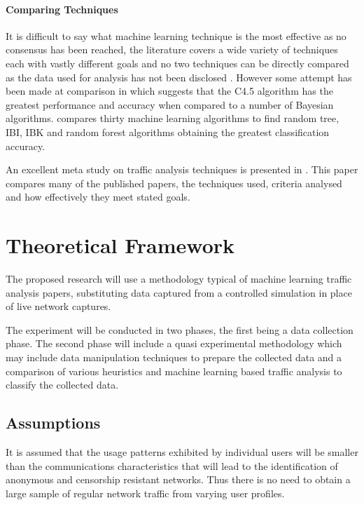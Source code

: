 \documentclass{conference}
\begin{document}
\subsubsection{Comparing Techniques}

It is difficult to say what machine learning technique is the most effective as no consensus has been reached, the literature covers a wide variety of techniques each with vastly different goals and no two techniques can be directly compared as the data used for analysis has not been disclosed \citep{Kim:2007p3867}. However some attempt has been made at comparison in \cite{Williams:2006p3849} which suggests that the C4.5 algorithm has the greatest performance and accuracy when compared to a number of Bayesian algorithms. \cite{Mohd:2009p6484} compares thirty machine learning algorithms  to find random tree, IBI, IBK and random forest algorithms obtaining the greatest classification accuracy.

An excellent meta study on traffic analysis techniques is presented in \cite{Nguyen:2008p3837}. This paper compares many of the published papers, the techniques used, criteria analysed and how effectively they meet stated goals.

\chapter{Theoretical Framework}

The proposed research will use a methodology typical of machine learning traffic analysis papers, substituting data captured from a controlled simulation in place of live network captures. 

The experiment will be conducted in two phases, the first being a data collection phase. The second phase will include a quasi experimental methodology which may include data manipulation techniques to prepare the collected data and a comparison of various heuristics and machine learning based traffic analysis to classify the collected data.

\section{Assumptions}

It is assumed that the usage patterns exhibited by individual users will be smaller than the communications characteristics that will lead to the identification of anonymous and censorship resistant networks. Thus there is no need to obtain a large sample of regular network traffic from varying user profiles.
\end{document}
